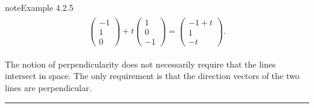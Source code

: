 \documentclass[letterpaper,10pt,english]{jupyterBook}
\begin{document}
\begin{sphinxadmonition}{note}{Example 4.2.5}
\begin{equation*}
\begin{split} \begin{align*}
    \begin{pmatrix} -1 \\ 1 \\ 0 \end{pmatrix} + t
    \begin{pmatrix} 1 \\ 0 \\ -1 \end{pmatrix} = 
    \begin{pmatrix} -1 + t \\ 1 \\ -t \end{pmatrix}.
\end{align*} \end{split}
\end{equation*}\end{sphinxadmonition}

\sphinxAtStartPar
The notion of perpendicularity does not necessarily require that the lines intersect in space. The only requirement is that the direction vectors of the two lines are perpendicular.


\bigskip\hrule\bigskip


\sphinxstepscope

\ignorespaces 
\end{document}
